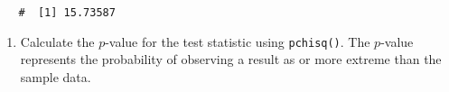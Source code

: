 \documentclass[letterpaper,12pt,twoside,]{pinp}
\begin{document}
\begin{enumerate}
\begin{enumerate}
    \color{black}
  \end{enumerate}

\begin{Shaded}
\begin{Highlighting}[]
\NormalTok{ =}\StringTok{ }
\NormalTok{ =}\StringTok{ } \OperatorTok{-}\StringTok{ }\NormalTok{)}\OperatorTok{^}\NormalTok{)}\OperatorTok{/}

\NormalTok{ =}\StringTok{ }
\NormalTok{ =}\StringTok{ } \OperatorTok{-}\StringTok{ }\NormalTok{)}\OperatorTok{^}\NormalTok{)}\OperatorTok{/}

\NormalTok{ =}\StringTok{ }
\NormalTok{ =}\StringTok{ } \OperatorTok{-}\StringTok{ }\NormalTok{)}\OperatorTok{^}\NormalTok{)}\OperatorTok{/}

\NormalTok{ =}\StringTok{ }
\NormalTok{ =}\StringTok{ } \OperatorTok{-}\StringTok{ }\NormalTok{)}\OperatorTok{^}\NormalTok{)}\OperatorTok{/}

\StringTok{ } \OperatorTok{+}\StringTok{ } \OperatorTok{+}\StringTok{ } \OperatorTok{+}\StringTok{ }
\end{Highlighting}
\end{Shaded}

  \begin{ShadedResult}
   \begin{verbatim}
   #  [1] 15.73587
   \end{verbatim}
   \end{ShadedResult}

  \begin{enumerate}
  \def\labelenumii{\alph{enumii})}
  \setcounter{enumii}{4}
  \item
    Calculate the \(p\)-value for the test statistic using
    \texttt{pchisq()}. The \(p\)-value represents the probability of
    observing a result as or more extreme than the sample data.


\end{enumerate}
\end{enumerate}
\end{document}
